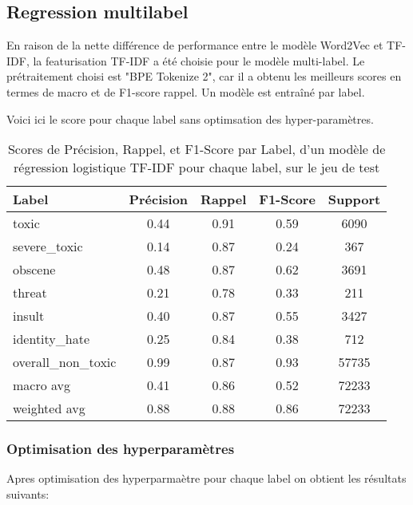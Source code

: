 \subsection{Regression multilabel}
En raison de la nette différence de performance entre le modèle Word2Vec et TF-IDF, la featurisation TF-IDF a été choisie pour le modèle multi-label. 
Le prétraitement choisi est "BPE Tokenize 2", car il a obtenu les meilleurs scores en termes de macro et de F1-score rappel. 
Un modèle est entraîné par label.

Voici ici le score pour chaque label sans optimsation des hyper-paramètres.
\begin{table}[ht]
    \centering
    \caption{Scores de Précision, Rappel, et F1-Score par Label, d'un modèle de régression logistique TF-IDF pour chaque label, sur le jeu de test}
    \begin{tabular}{lcccc}
    \hline
    \textbf{Label} & \textbf{Précision} & \textbf{Rappel} & \textbf{F1-Score} & \textbf{Support} \\ \hline
    toxic          & 0.44               & 0.91            & 0.59              & 6090             \\
    severe\_toxic  & 0.14               & 0.87            & 0.24              & 367              \\
    obscene        & 0.48               & 0.87            & 0.62              & 3691             \\
    threat         & 0.21               & 0.78            & 0.33              & 211              \\
    insult         & 0.40               & 0.87            & 0.55              & 3427             \\
    identity\_hate & 0.25               & 0.84            & 0.38              & 712              \\
    overall\_non\_toxic & 0.99           & 0.87            & 0.93              & 57735            \\\hline
    macro avg      & 0.41               & 0.86            & 0.52              & 72233            \\
    weighted avg   & 0.88               & 0.88            & 0.86              & 72233            \\
    \end{tabular}
    \label{tab:scores}
\end{table}
\subsubsection{Optimisation des hyperparamètres}
Apres optimisation des hyperparmaètre pour chaque label on obtient les résultats suivants:

